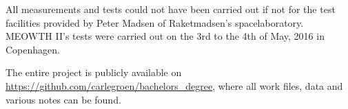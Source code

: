 All measurements and tests could not have been carried out if not for the test facilities provided by Peter Madsen of Raketmadsen's spacelaboratory. MEOWTH II's tests were carried out on the 3rd to the 4th of May, 2016 in Copenhagen.

The entire project is publicly available on \url{https://github.com/carlegroen/bachelors_degree}, where all work files, data and various notes can be found.
